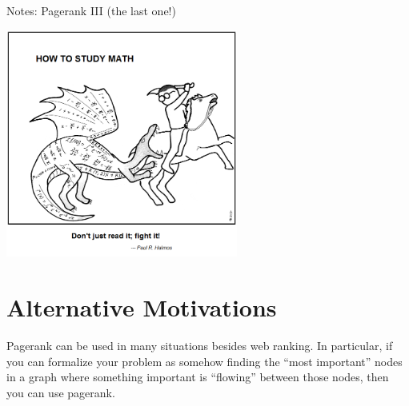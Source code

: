 \documentclass[10pt]{exam}
\theoremstyle{definition}
\begin{document}
\begin{center}
{
\Huge
    Notes: Pagerank III (the last one!)
}

\vspace{0.15in}
\includegraphics[width=3in]{saint_curious_george}
\vspace{-0.15in}

\end{center}

\begin{center}
\end{center}

\section{Alternative Motivations}

Pagerank can be used in many situations besides web ranking.
In particular, if you can formalize your problem as somehow finding the ``most important'' nodes in a graph where something important is ``flowing'' between those nodes,
then you can use pagerank.
\end{document}
